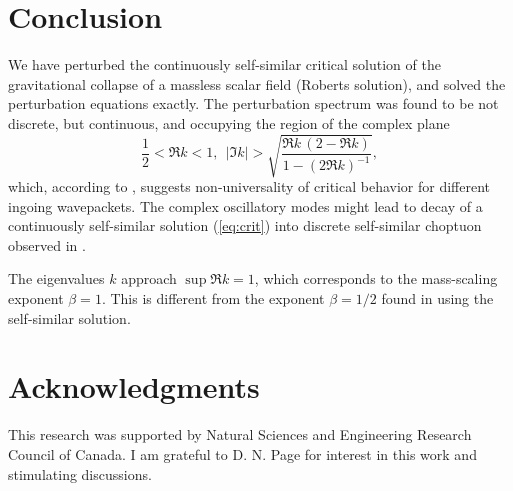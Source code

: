 \section{Conclusion} \label{sec:conclusion}

We have perturbed the continuously self-similar critical solution of
the gravitational collapse of a massless scalar field (Roberts
solution), and solved the perturbation equations exactly. The
perturbation spectrum was found to be not discrete, but continuous, and
occupying the region of the complex plane
\begin{equation}
  \frac{1}{2} < \Re k < 1,\ \ 
  |\Im k| > \sqrt{\frac{\Re k\, (2 - \Re k)}{1 - (2\Re k)^{-1}}},
\end{equation}
which, according to \cite{Hara&Koike&Adachi:96}, suggests
non-universality of critical behavior for different ingoing
wavepackets. The complex oscillatory modes might lead to decay of a
continuously self-similar solution (\ref{eq:crit}) into discrete
self-similar choptuon observed in \cite{Choptuik:93}.

The eigenvalues $k$ approach $\sup \Re k = 1$, which corresponds to the
mass-scaling exponent $\beta=1$. This is different from the exponent
$\beta=1/2$ found in \cite{Brady:94,Oshiro&Nakamura&Tomimatsu:94,%
Wang&Oliveira:96} using the self-similar solution.


\section*{Acknowledgments}

This research was supported by Natural Sciences and Engineering
Research Council of Canada. I am grateful to D. N. Page for interest
in this work and stimulating discussions.




